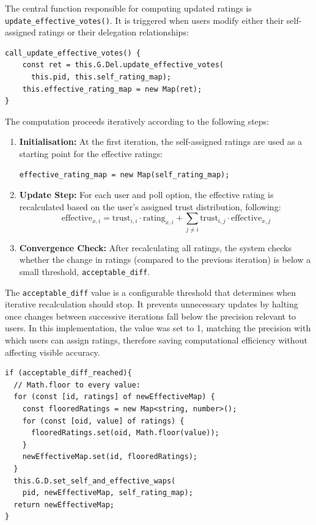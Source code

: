 The central function responsible for computing updated ratings is \texttt{update\_effective\_votes()}. It is triggered when users modify either their self-assigned ratings or their delegation relationships:

\begin{verbatim}
call_update_effective_votes() {
    const ret = this.G.Del.update_effective_votes(
      this.pid, this.self_rating_map);
    this.effective_rating_map = new Map(ret);
}
\end{verbatim}

The computation proceeds iteratively according to the following steps:

\begin{enumerate}
    \item \textbf{Initialisation:} At the first iteration, the self-assigned ratings are used as a starting point for the effective ratings:
    \begin{verbatim}
effective_rating_map = new Map(self_rating_map);
    \end{verbatim}
    \item \textbf{Update Step:} For each user and poll option, the effective rating is recalculated based on the user's assigned trust distribution, following:
    \begin{equation}
      \text{effective}_{x, i} = \text{trust}_{i,i} \cdot \text{rating}_{x,i} + \sum_{j \neq i} \text{trust}_{i,j} \cdot \text{effective}_{x,j}
      \label{eq:effective_rating}
    \end{equation}      
    \item \textbf{Convergence Check:} After recalculating all ratings, the system checks whether the change in ratings (compared to the previous iteration) is below a small threshold, \texttt{acceptable\_diff}.
\end{enumerate}

The \texttt{acceptable\_diff} value is a configurable threshold that determines when iterative recalculation should stop. It prevents unnecessary updates by halting once changes between successive iterations fall below the precision relevant to users. In this implementation, the value was set to 1, matching the precision with which users can assign ratings, therefore saving computational efficiency without affecting visible accuracy.

\begin{verbatim}
if (acceptable_diff_reached){
  // Math.floor to every value:
  for (const [id, ratings] of newEffectiveMap) {
    const flooredRatings = new Map<string, number>();
    for (const [oid, value] of ratings) {
      flooredRatings.set(oid, Math.floor(value));
    }
    newEffectiveMap.set(id, flooredRatings);
  }
  this.G.D.set_self_and_effective_waps(
    pid, newEffectiveMap, self_rating_map);
  return newEffectiveMap;
}
\end{verbatim}

